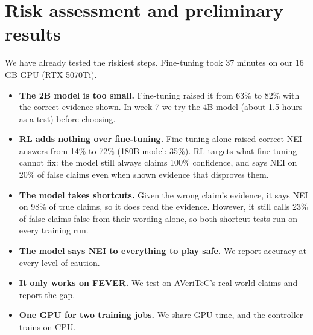 \documentclass[10pt]{article}
\begin{document}
\section*{Risk assessment and preliminary results}
We have already tested the riskiest steps. Fine-tuning took 37 minutes on our 16\,GB GPU (RTX 5070Ti).
\begin{itemize}[leftmargin=*,nosep]
  \item \textbf{The 2B model is too small.} Fine-tuning raised it from 63\% to 82\% with the correct evidence
        shown. In week 7 we try the 4B model (about 1.5 hours as a test) before choosing.
  \item \textbf{RL adds nothing over fine-tuning.} Fine-tuning alone raised correct NEI answers from 14\% to
        72\% (180B model: 35\%). RL targets what fine-tuning cannot fix: the model still always claims 100\%
        confidence, and says NEI on 20\% of false claims even when shown evidence that disproves them.
  \item \textbf{The model takes shortcuts.} Given the wrong claim's evidence, it says NEI on 98\% of true
        claims, so it does read the evidence. However, it still calls 23\% of false claims false from their
        wording alone, so both shortcut tests run on every training run.
  \item \textbf{The model says NEI to everything to play safe.} We report accuracy at every level of caution.
  \item \textbf{It only works on FEVER.} We test on AVeriTeC's real-world claims and report the gap.
  \item \textbf{One GPU for two training jobs.} We share GPU time, and the controller trains on CPU.
\end{itemize}
\end{document}
